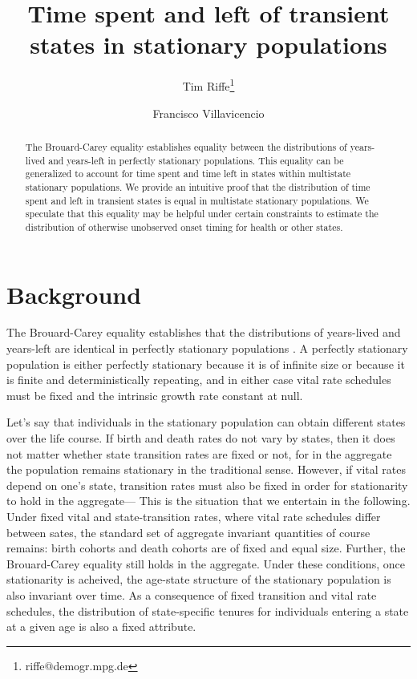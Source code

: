 \documentclass[12pt,oneside,a4paper]{article} %
\theoremstyle{definition}
\begin{document}
\title{Time spent and left of transient states in
stationary populations}
\author[1]{Tim Riffe\thanks{riffe@demogr.mpg.de}}
\author[2,3]{Francisco Villavicencio}

\maketitle

\begin{abstract}
The Brouard-Carey equality establishes equality between the distributions of
years-lived and years-left in perfectly stationary populations. This equality can be generalized to account for time
spent and time left in states within multistate stationary populations. We
provide an intuitive proof that the distribution of time spent and left in
transient states is equal in multistate stationary populations. We speculate
that this equality may be helpful under certain constraints to estimate the
distribution of otherwise unobserved onset timing for health or other states.
\end{abstract}

\section{Background}
The Brouard-Carey equality establishes that the distributions of years-lived and years-left are identical in perfectly
stationary populations
\citep{brouard1989mouvements,Vaupel2009,rao2014,villavicencioRiffeSymmetires2016}.
A perfectly stationary population is either perfectly stationary because it is
of infinite size or because it is finite and
deterministically repeating, and in either case vital rate schedules must be fixed and the intrinsic growth rate
constant at null.

Let's say that individuals in
the stationary population can obtain different states over the life course. If
birth and death rates do not vary by states, then it does not matter whether
state transition rates are fixed or not, for in the aggregate the population remains
stationary in the traditional sense. However, if vital rates depend on one's
state, transition rates must also be fixed in order for stationarity to
hold in the aggregate--- This is the situation that we entertain in the
following. Under fixed vital and state-transition rates, where vital rate
schedules differ between sates, the standard set of aggregate invariant
quantities of course remains:
birth cohorts and death cohorts are of fixed and equal size. Further, the
Brouard-Carey equality still holds in the aggregate. Under these conditions,
once stationarity is acheived, the age-state structure of the stationary
population is also invariant over time. As a consequence of fixed transition
and vital rate schedules, the distribution of state-specific tenures for
individuals entering a state at a given age is also a fixed attribute.
\end{document}
